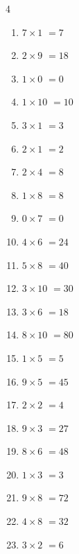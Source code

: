\begin{multicols}{4}
\begin{enumerate}
  \item $7\times 1$
        $=7$

  \item $2\times 9$
        $=18$

  \item $1\times 0$
        $=0$

  \item $1\times 10$
        $=10$

  \item $3\times 1$
        $=3$

  \item $2\times 1$
        $=2$

  \item $2\times 4$
        $=8$

  \item $1\times 8$
        $=8$

  \item $0\times 7$
        $=0$

  \item $4\times 6$
        $=24$

  \item $5\times 8$
        $=40$

  \item $3\times 10$
        $=30$

  \item $3\times 6$
        $=18$

  \item $8\times 10$
        $=80$

  \item $1\times 5$
        $=5$

  \item $9\times 5$
        $=45$

  \item $2\times 2$
        $=4$

  \item $9\times 3$
        $=27$

  \item $8\times 6$
        $=48$

  \item $1\times 3$
        $=3$

  \item $9\times 8$
        $=72$

  \item $4\times 8$
        $=32$

  \item $3\times 2$
        $=6$


\end{enumerate}
\end{multicols}
